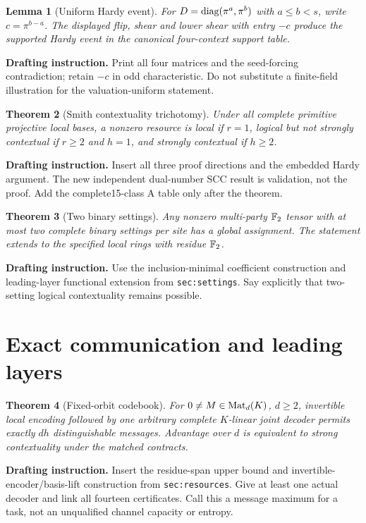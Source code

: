 \documentclass[11pt]{article}
\newtheorem{theorem}{Theorem}[section]
\newtheorem{lemma}[theorem]{Lemma}
\newcommand{\buildnote}[1]{\par\smallskip\noindent\textbf{Drafting instruction.} #1\par\smallskip}
\begin{document}
\begin{lemma}[Uniform Hardy event]
For $D=\operatorname{diag}(\pi^a,\pi^b)$ with $a\leq b<s$, write $c=\pi^{b-a}$.
The displayed flip, shear and lower shear with entry $-c$ produce the supported
Hardy event in the canonical four-context support table.
\end{lemma}
\buildnote{Print all four matrices and the seed-forcing contradiction; retain
$-c$ in odd characteristic. Do not substitute a finite-field illustration for
the valuation-uniform statement.}

\begin{theorem}[Smith contextuality trichotomy]
Under all complete primitive projective local bases, a nonzero resource is
local if $r=1$, logical but not strongly contextual if $r\geq2$ and $h=1$,
and strongly contextual if $h\geq2$.
\end{theorem}
\buildnote{Insert all three proof directions and the embedded Hardy argument.
The new independent dual-number SCC result is validation, not the proof.
Add the complete15-class A table only after the theorem.}

\begin{theorem}[Two binary settings]
Any nonzero multi-party $\mathbb F_2$ tensor with at most two complete binary settings
per site has a global assignment. The statement extends to the specified local
rings with residue $\mathbb F_2$.
\end{theorem}
\buildnote{Use the inclusion-minimal coefficient construction and leading-layer
functional extension from \texttt{sec:settings}. Say explicitly that two-setting
logical contextuality remains possible.}

\section{Exact communication and leading layers}
\begin{theorem}[Fixed-orbit codebook]
For $0\ne M\in\operatorname{Mat}_d(K)$, $d\geq2$, invertible local encoding followed by one
arbitrary complete $K$-linear joint decoder permits exactly $dh$
distinguishable messages. Advantage over $d$ is equivalent to strong
contextuality under the matched contracts.
\end{theorem}
\buildnote{Insert the residue-span upper bound and invertible-encoder/basis-lift
construction from \texttt{sec:resources}. Give at least one actual decoder and
link all fourteen certificates. Call this a message maximum for a task, not an
unqualified channel capacity or entropy.}
\end{document}
